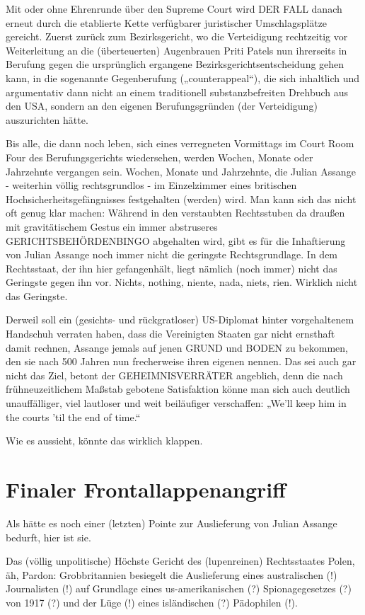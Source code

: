 \begin{multicols}{2}
Mit oder ohne Ehrenrunde über den Supreme Court wird
DER FALL danach erneut durch die etablierte Kette verfügbarer juristischer Umschlagsplätze gereicht. Zuerst
zurück zum Bezirksgericht, wo die Verteidigung rechtzeitig vor Weiterleitung an die (überteuerten) Augenbrauen Priti Patels nun ihrerseits in Berufung gegen die %
ursprünglich ergangene Bezirksgerichtsentscheidung
gehen kann, in die sogenannte Gegenberufung („counterappeal“), die sich inhaltlich und argumentativ dann
nicht an einem traditionell substanzbefreiten Drehbuch
aus den USA, sondern an den eigenen Berufungsgründen (der Verteidigung) auszurichten hätte.

Bis alle, die dann noch leben, sich eines verregneten
Vormittags im Court Room Four des Berufungsgerichts
wiedersehen, werden Wochen, Monate oder Jahrzehnte
vergangen sein. Wochen, Monate und Jahrzehnte, die
Julian Assange - weiterhin völlig rechtsgrundlos - im
Einzelzimmer eines britischen Hochsicherheitsgefängnisses festgehalten (werden) wird. Man kann sich das
nicht oft genug klar machen: Während in den verstaubten Rechtsstuben da draußen mit gravitätischem Gestus
ein immer abstruseres GERICHTSBEHÖRDENBINGO
abgehalten wird, gibt es für die Inhaftierung von Julian
Assange noch immer nicht die geringste Rechtsgrundlage. In dem Rechtsstaat, der ihn hier gefangenhält, liegt
nämlich (noch immer) nicht das Geringste gegen ihn
vor. Nichts, nothing, niente, nada, niets, rien. Wirklich
nicht das Geringste.

Derweil soll ein (gesichts- und rückgratloser) US-Diplomat hinter vorgehaltenem Handschuh verraten haben,
dass die Vereinigten Staaten gar nicht ernsthaft damit
rechnen, Assange jemals auf jenen GRUND und BODEN
zu bekommen, den sie nach 500 Jahren nun frecherweise ihren eigenen nennen. Das sei auch gar nicht das Ziel,
betont der GEHEIMNISVERRÄTER angeblich, denn die
nach frühneuzeitlichem Maßstab gebotene Satisfaktion
könne man sich auch deutlich unauffälliger, viel lautloser und weit beiläufiger verschaffen: „We’ll keep him in
the courts ’til the end of time.“

Wie es aussieht, könnte das wirklich klappen.


\section{Finaler Frontallappenangriff} %
Als hätte es noch einer (letzten) Pointe zur Auslieferung
von Julian Assange bedurft, hier ist sie.

Das (völlig unpolitische) Höchste Gericht des (lupenreinen) Rechtsstaates Polen, äh, Pardon: Grobbritannien
besiegelt die Auslieferung eines australischen (!) Journalisten (!) auf Grundlage eines us-amerikanischen (?)
Spionagegesetzes (?) von 1917 (?) und der Lüge (!) eines
isländischen (?) Pädophilen (!).


\end{multicols}
